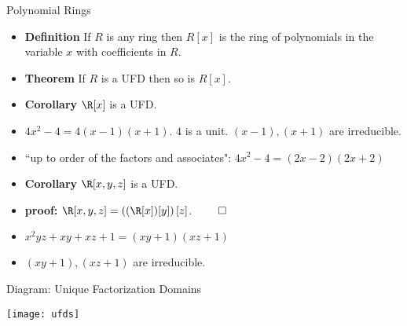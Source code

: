 \documentclass[handout]{beamer}
\begin{document}
\begin{frame}{Polynomial Rings}

\begin{itemize}
  \item \textbf{Definition} If $R$ is any ring then $R[x]$ is the ring of polynomials in the variable $x$ with coefficients in $R$.
  \item \textbf{Theorem} If $R$ is a UFD then so is $R[x]$.
  \item \textbf{Corollary} $\R[x]$ is a UFD.
  \item $4x^2 -4 = 4(x-1)(x+1)$. $4$ is a unit. $(x-1),(x+1)$ are irreducible.
  \item ``up to order of the factors and associates": $4x^2 -4 = (2x-2)(2x+2)$
  \item \textbf{Corollary} $\R[x,y,z]$ is a UFD.
  \item \textbf{proof:} $\R[x,y,z] = \left( (\R[x])[y] \right ) [z]$. $\qed$
  \item $x^2yz +xy +xz +1 = (xy+1)(xz+1)$
  \item $(xy+1), (xz+1)$ are irreducible.
\end{itemize}

\end{frame}


\begin{frame}{Diagram: Unique Factorization Domains}

\begin{center}
\texttt{[image: ufds]}
\end{center}

\end{frame}



\end{document}
